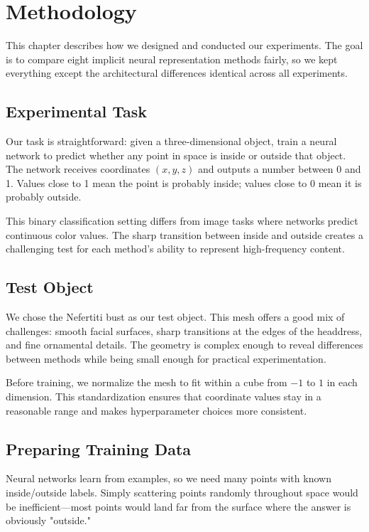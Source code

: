 \chapter{Methodology}
\label{ch:methodology}

This chapter describes how we designed and conducted our experiments. The goal is to compare eight implicit neural representation methods fairly, so we kept everything except the architectural differences identical across all experiments.

\section{Experimental Task}

Our task is straightforward: given a three-dimensional object, train a neural network to predict whether any point in space is inside or outside that object. The network receives coordinates $(x, y, z)$ and outputs a number between 0 and 1. Values close to 1 mean the point is probably inside; values close to 0 mean it is probably outside.

This binary classification setting differs from image tasks where networks predict continuous color values. The sharp transition between inside and outside creates a challenging test for each method's ability to represent high-frequency content.

\section{Test Object}

We chose the Nefertiti bust as our test object. This mesh offers a good mix of challenges: smooth facial surfaces, sharp transitions at the edges of the headdress, and fine ornamental details. The geometry is complex enough to reveal differences between methods while being small enough for practical experimentation.

Before training, we normalize the mesh to fit within a cube from $-1$ to $1$ in each dimension. This standardization ensures that coordinate values stay in a reasonable range and makes hyperparameter choices more consistent.

\section{Preparing Training Data}

Neural networks learn from examples, so we need many points with known inside/outside labels. Simply scattering points randomly throughout space would be inefficient---most points would land far from the surface where the answer is obviously "outside."

